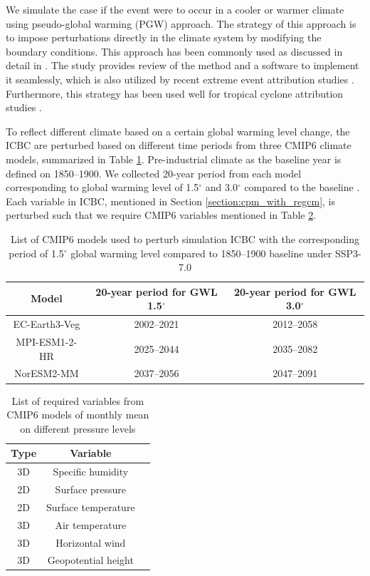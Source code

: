 We simulate the case if the event were to occur in a cooler or warmer climate using pseudo-global warming (PGW) approach. The strategy of this approach is to impose perturbations directly in the climate system by modifying the boundary conditions. This approach has been commonly used as discussed in detail in \citet{brogli2023pseudo}. The study provides review of the method and a software to implement it seamlessly, which is also utilized by recent extreme event attribution studies \citep{calvo2026human}. Furthermore, this strategy has been used well for tropical cyclone attribution studies \citep{patricola2018anthropogenic}.

To reflect different climate based on a certain global warming level change, the ICBC are perturbed based on different time periods from three CMIP6 climate models, summarized in Table \ref{table:cmip6}. Pre-industrial climate as the baseline year is defined on 1850--1900. We collected 20-year period from each model corresponding to global warming level of 1.5$^\circ$ and 3.0$^\circ$ compared to the baseline \citep{hauser2022transient}. Each variable in ICBC, mentioned in Section \ref{section:cpm_with_regcm}, is perturbed such that we require CMIP6 variables mentioned in Table \ref{table:cmip6_vars}.

\begin{table}[h] 
\centering
\begin{tabular}{ccc} 
\hline
\textbf{Model} & \textbf{20-year period for GWL 1.5$^\circ$} & \textbf{20-year period for GWL 3.0$^\circ$} \\
\hline
EC-Earth3-Veg & 2002--2021 & 2012--2058 \\
MPI-ESM1-2-HR & 2025--2044 & 2035--2082 \\
NorESM2-MM & 2037--2056 & 2047--2091 \\

\hline
\end{tabular}
\caption{List of CMIP6 models used to perturb simulation ICBC with the corresponding period of 1.5$^\circ$ global warming level compared to 1850--1900 baseline under SSP3-7.0 \citep{hauser2022transient}}
\label{table:cmip6}
\end{table}

\begin{table}[h] 
\centering
\begin{tabular}{ccc} 
\hline
\textbf{Type} & \textbf{Variable} \\
\hline
3D	&Specific humidity \\
2D	&Surface pressure \\
2D	&Surface temperature \\
3D	&Air temperature \\
3D	&Horizontal wind \\
3D	&Geopotential height \\
\hline
\end{tabular}
\caption{List of required variables from CMIP6 models of monthly mean on different pressure levels}
\label{table:cmip6_vars}
\end{table}

